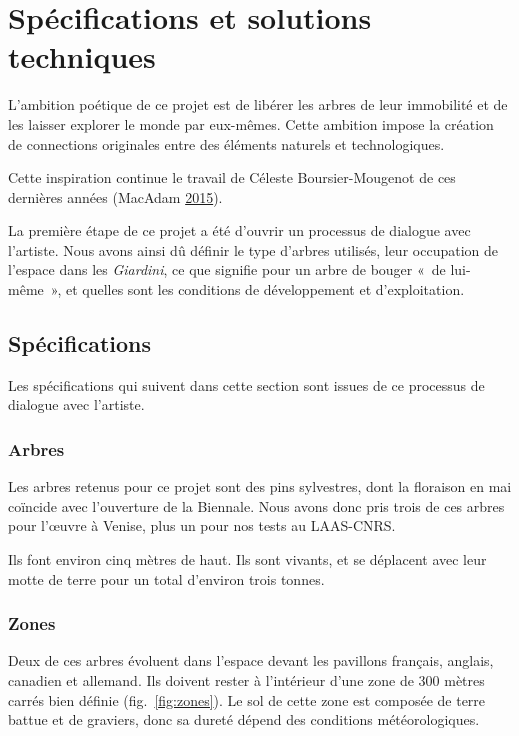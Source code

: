 \documentclass[french,A4paper,]{book}
\begin{document}
\section{Spécifications et solutions techniques}\label{sec:transspecs}

L'ambition poétique de ce projet est de libérer les arbres de leur
immobilité et de les laisser explorer le monde par eux-mêmes. Cette
ambition impose la création de connections originales entre des éléments
naturels et technologiques.

Cette inspiration continue le travail de Céleste Boursier-Mougenot de
ces dernières années (MacAdam \protect\hyperlink{ref-MacAdam}{2015}).

La première étape de ce projet a été d'ouvrir un processus de dialogue
avec l'artiste. Nous avons ainsi dû définir le type d'arbres utilisés,
leur occupation de l'espace dans les \emph{Giardini}, ce que signifie
pour un arbre de bouger «~de lui-même~», et quelles sont les conditions
de développement et d'exploitation.

\subsection{Spécifications}\label{spuxe9cifications}

Les spécifications qui suivent dans cette section sont issues de ce
processus de dialogue avec l'artiste.

\subsubsection{Arbres}\label{arbres}

Les arbres retenus pour ce projet sont des pins sylvestres, dont la
floraison en mai coïncide avec l'ouverture de la Biennale. Nous avons
donc pris trois de ces arbres pour l'œuvre à Venise, plus un pour nos
tests au LAAS-CNRS.

Ils font environ cinq mètres de haut. Ils sont vivants, et se déplacent
avec leur motte de terre pour un total d'environ trois tonnes.

\subsubsection{Zones}\label{zones}

Deux de ces arbres évoluent dans l'espace devant les pavillons français,
anglais, canadien et allemand. Ils doivent rester à l'intérieur d'une
zone de 300 mètres carrés bien définie (fig.~\ref{fig:zones}). Le sol de
cette zone est composée de terre battue et de graviers, donc sa dureté
dépend des conditions météorologiques.
\end{document}

